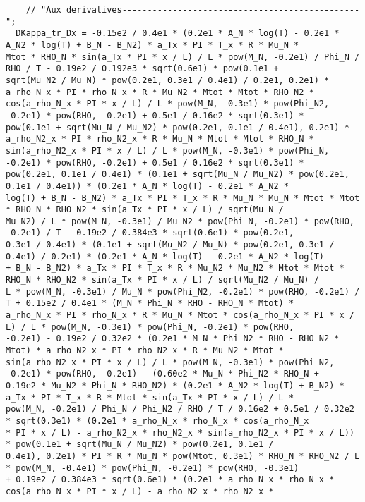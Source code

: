 \documentclass[10pt]{article}
\begin{document}
\begin{scriptsize}
\begin{verbatim}
    // "Aux derivatives-----------------------------------------------";
  DKappa_tr_Dx = -0.15e2 / 0.4e1 * (0.2e1 * A_N * log(T) - 0.2e1 * A_N2 * log(T) + B_N - B_N2) * a_Tx * PI * T_x * R * Mu_N *
Mtot * RHO_N * sin(a_Tx * PI * x / L) / L * pow(M_N, -0.2e1) / Phi_N / RHO / T - 0.19e2 / 0.192e3 * sqrt(0.6e1) * pow(0.1e1 +
sqrt(Mu_N2 / Mu_N) * pow(0.2e1, 0.3e1 / 0.4e1) / 0.2e1, 0.2e1) * a_rho_N_x * PI * rho_N_x * R * Mu_N2 * Mtot * Mtot * RHO_N2 *
cos(a_rho_N_x * PI * x / L) / L * pow(M_N, -0.3e1) * pow(Phi_N2, -0.2e1) * pow(RHO, -0.2e1) + 0.5e1 / 0.16e2 * sqrt(0.3e1) *
pow(0.1e1 + sqrt(Mu_N / Mu_N2) * pow(0.2e1, 0.1e1 / 0.4e1), 0.2e1) * a_rho_N2_x * PI * rho_N2_x * R * Mu_N * Mtot * Mtot * RHO_N *
sin(a_rho_N2_x * PI * x / L) / L * pow(M_N, -0.3e1) * pow(Phi_N, -0.2e1) * pow(RHO, -0.2e1) + 0.5e1 / 0.16e2 * sqrt(0.3e1) *
pow(0.2e1, 0.1e1 / 0.4e1) * (0.1e1 + sqrt(Mu_N / Mu_N2) * pow(0.2e1, 0.1e1 / 0.4e1)) * (0.2e1 * A_N * log(T) - 0.2e1 * A_N2 *
log(T) + B_N - B_N2) * a_Tx * PI * T_x * R * Mu_N * Mu_N * Mtot * Mtot * RHO_N * RHO_N2 * sin(a_Tx * PI * x / L) / sqrt(Mu_N /
Mu_N2) / L * pow(M_N, -0.3e1) / Mu_N2 * pow(Phi_N, -0.2e1) * pow(RHO, -0.2e1) / T - 0.19e2 / 0.384e3 * sqrt(0.6e1) * pow(0.2e1,
0.3e1 / 0.4e1) * (0.1e1 + sqrt(Mu_N2 / Mu_N) * pow(0.2e1, 0.3e1 / 0.4e1) / 0.2e1) * (0.2e1 * A_N * log(T) - 0.2e1 * A_N2 * log(T)
+ B_N - B_N2) * a_Tx * PI * T_x * R * Mu_N2 * Mu_N2 * Mtot * Mtot * RHO_N * RHO_N2 * sin(a_Tx * PI * x / L) / sqrt(Mu_N2 / Mu_N) /
L * pow(M_N, -0.3e1) / Mu_N * pow(Phi_N2, -0.2e1) * pow(RHO, -0.2e1) / T + 0.15e2 / 0.4e1 * (M_N * Phi_N * RHO - RHO_N * Mtot) *
a_rho_N_x * PI * rho_N_x * R * Mu_N * Mtot * cos(a_rho_N_x * PI * x / L) / L * pow(M_N, -0.3e1) * pow(Phi_N, -0.2e1) * pow(RHO,
-0.2e1) - 0.19e2 / 0.32e2 * (0.2e1 * M_N * Phi_N2 * RHO - RHO_N2 * Mtot) * a_rho_N2_x * PI * rho_N2_x * R * Mu_N2 * Mtot *
sin(a_rho_N2_x * PI * x / L) / L * pow(M_N, -0.3e1) * pow(Phi_N2, -0.2e1) * pow(RHO, -0.2e1) - (0.60e2 * Mu_N * Phi_N2 * RHO_N +
0.19e2 * Mu_N2 * Phi_N * RHO_N2) * (0.2e1 * A_N2 * log(T) + B_N2) * a_Tx * PI * T_x * R * Mtot * sin(a_Tx * PI * x / L) / L *
pow(M_N, -0.2e1) / Phi_N / Phi_N2 / RHO / T / 0.16e2 + 0.5e1 / 0.32e2 * sqrt(0.3e1) * (0.2e1 * a_rho_N_x * rho_N_x * cos(a_rho_N_x
* PI * x / L) - a_rho_N2_x * rho_N2_x * sin(a_rho_N2_x * PI * x / L)) * pow(0.1e1 + sqrt(Mu_N / Mu_N2) * pow(0.2e1, 0.1e1 /
0.4e1), 0.2e1) * PI * R * Mu_N * pow(Mtot, 0.3e1) * RHO_N * RHO_N2 / L * pow(M_N, -0.4e1) * pow(Phi_N, -0.2e1) * pow(RHO, -0.3e1)
+ 0.19e2 / 0.384e3 * sqrt(0.6e1) * (0.2e1 * a_rho_N_x * rho_N_x * cos(a_rho_N_x * PI * x / L) - a_rho_N2_x * rho_N2_x *

\end{verbatim}
\end{scriptsize}
\end{document}
